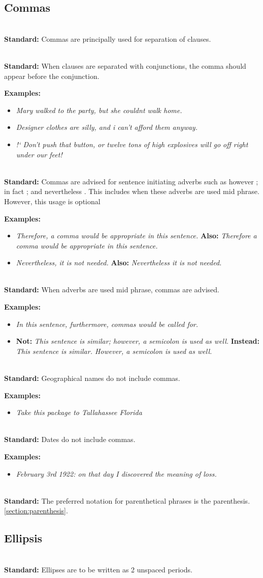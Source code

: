 \documentclass{article}
\newcommand{\standard}[1]{\quad  \\ \textbf{Standard:} {#1}}
\newcommand{\examples}[1]{
\textbf{Examples:} \begin{itemize}
#1
\end{itemize}
}
\newcommand{\example}[1]{\item \textit{#1}}
\newcommand{\nonexample}[2]{\item \textbf{Not:} \textit{#1} \textbf{Instead:}
  \textit{#2}}
\newcommand{\bothokay}[2]{\item \textit{#1} \textbf{Also:} \textit{#2}}
\newcommand{\langlequote}{\guillemotleft}
\newcommand{\ranglequote}{\guillemotright}
\begin{document}
\subsection{Commas}


\standard{Commas are principally used for separation of clauses.}

\standard{When clauses are separated with conjunctions, the comma should appear
before the conjunction.}

\examples{
  \example{Mary walked to the party, but she couldnt walk home.}
  \example{Designer clothes are silly, and i can't afford them anyway.}
  \example{!` Don't push that button, or twelve tons of high explosives will go off
  right under our feet!}
}

\standard{Commas are advised for sentence initiating adverbs such as
\langlequote however \ranglequote; \langlequote in fact \ranglequote; and
\langlequote nevertheless \ranglequote. This includes when these adverbs are
used mid phrase. However, this usage is optional}

\examples{
  \bothokay{Therefore, a comma would be appropriate in this sentence.}{Therefore
  a comma would be appropriate in this sentence.}
  \bothokay{Nevertheless, it is not needed.}{Nevertheless it is not needed.}
}

\standard{When adverbs are used mid phrase, commas are advised.}

\examples{
  \example{In this sentence, furthermore, commas would be called for.}
  \nonexample{This sentence is similar; however, a semicolon is used as
  well.}{This sentence is similar. However, a semicolon is used as well.}
}

\standard{Geographical names do not include commas.}

\examples{
  \example{Take this package to Tallahassee Florida}
}

\standard{Dates do not include commas.}

\examples{
  \example{February 3rd 1922: on that day I discovered the meaning of loss.}
}

\standard{The preferred notation for parenthetical phrases is the parenthesis.
\ref{section:parenthesis}.}

\subsection{Ellipsis}

\standard{Ellipses are to be written as 2 unspaced periods.}
\end{document}
